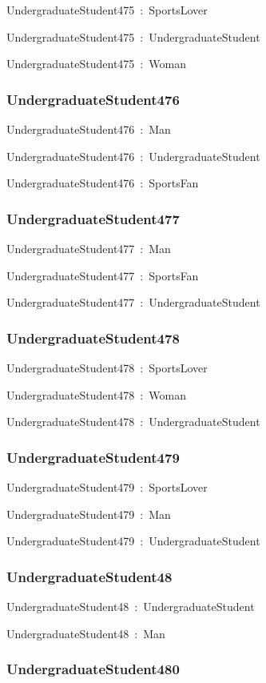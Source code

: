 \documentclass{article}
\begin{document}
UndergraduateStudent475~:~SportsLover

UndergraduateStudent475~:~UndergraduateStudent

UndergraduateStudent475~:~Woman

\subsubsection*{UndergraduateStudent476}

UndergraduateStudent476~:~Man

UndergraduateStudent476~:~UndergraduateStudent

UndergraduateStudent476~:~SportsFan

\subsubsection*{UndergraduateStudent477}

UndergraduateStudent477~:~Man

UndergraduateStudent477~:~SportsFan

UndergraduateStudent477~:~UndergraduateStudent

\subsubsection*{UndergraduateStudent478}

UndergraduateStudent478~:~SportsLover

UndergraduateStudent478~:~Woman

UndergraduateStudent478~:~UndergraduateStudent

\subsubsection*{UndergraduateStudent479}

UndergraduateStudent479~:~SportsLover

UndergraduateStudent479~:~Man

UndergraduateStudent479~:~UndergraduateStudent

\subsubsection*{UndergraduateStudent48}

UndergraduateStudent48~:~UndergraduateStudent

UndergraduateStudent48~:~Man

\subsubsection*{UndergraduateStudent480}
\end{document}
